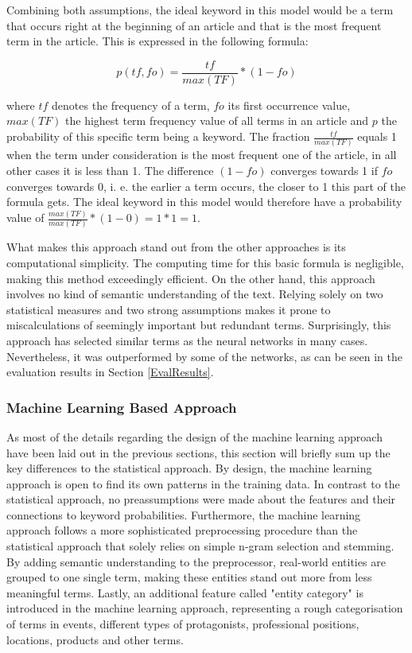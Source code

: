 \documentclass[11pt,a4paper,twoside]{article}
\begin{document}
\noindent Combining both assumptions, the ideal keyword in this model would be a term that occurs right at the beginning of an article and that is the most frequent term in the article. This is expressed in the following formula:

\[
p(tf, fo) = \frac{tf}{max(TF)} * (1 - fo)
\]

\noindent where $tf$ denotes the frequency of a term, $fo$ its first occurrence value, $max(TF)$ the highest term frequency value of all terms in an article and $p$ the probability of this specific term being a keyword. The fraction $\frac{tf}{max(TF)}$ equals 1 when the term under consideration is the most frequent one of the article, in all other cases it is less than 1. The difference $(1 - fo)$ converges towards 1 if $fo$ converges towards 0, i. e. the earlier a term occurs, the closer to 1 this part of the formula gets. The ideal keyword in this model would therefore have a probability value of $\frac{max(TF)}{max(TF)} * (1 - 0) = 1 * 1 = 1$.

What makes this approach stand out from the other approaches is its computational simplicity. The computing time for this basic formula is negligible, making this method exceedingly efficient. On the other hand, this approach involves no kind of semantic understanding of the text. Relying solely on two statistical measures and two strong assumptions makes it prone to miscalculations of seemingly important but redundant terms. Surprisingly, this approach has selected similar terms as the neural networks in many cases. Nevertheless, it was outperformed by some of the networks, as can be seen in the evaluation results in Section \ref{EvalResults}.

\subsubsection{Machine Learning Based Approach} \label{SystemClassificationML}

As most of the details regarding the design of the machine learning approach have been laid out in the previous sections, this section will briefly sum up the key differences to the statistical approach. By design, the machine learning approach is open to find its own patterns in the training data. In contrast to the statistical approach, no preassumptions were made about the features and their connections to keyword probabilities. Furthermore, the machine learning approach follows a more sophisticated preprocessing procedure than the statistical approach that solely relies on simple n-gram selection and stemming. By adding semantic understanding to the preprocessor, real-world entities are grouped to one single term, making these entities stand out more from less meaningful terms. Lastly, an additional feature called "entity category" is introduced in the machine learning approach, representing a rough categorisation of terms in events, different types of protagonists, professional positions, locations, products and other terms.
\end{document}
